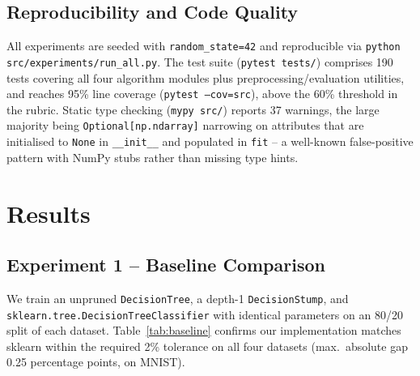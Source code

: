 \documentclass[conference]{IEEEtran}
\begin{document}
\subsection{Reproducibility and Code Quality}
All experiments are seeded with \texttt{random\_state=42} and reproducible via
\texttt{python src/experiments/run\_all.py}. The test suite
(\texttt{pytest tests/}) comprises 190 tests covering all four algorithm
modules plus preprocessing/evaluation utilities, and reaches 95\% line
coverage (\texttt{pytest --cov=src}), above the 60\% threshold in the rubric.
Static type checking (\texttt{mypy src/}) reports 37 warnings, the large
majority being \texttt{Optional[np.ndarray]} narrowing on attributes that are
initialised to \texttt{None} in \texttt{\_\_init\_\_} and populated in
\texttt{fit} -- a well-known false-positive pattern with NumPy stubs rather
than missing type hints.

\section{Results}
\label{sec:results}

\subsection{Experiment 1 -- Baseline Comparison}
\label{sec:results:baseline}
We train an unpruned \texttt{DecisionTree}, a depth-1 \texttt{DecisionStump},
and \texttt{sklearn.tree.DecisionTreeClassifier} with identical parameters on
an 80/20 split of each dataset. Table~\ref{tab:baseline} confirms our
implementation matches sklearn within the required 2\% tolerance on all four
datasets (max.\ absolute gap 0.25 percentage points, on MNIST).

\begin{table}[t]
\caption{Baseline accuracy: our tree vs.\ sklearn vs.\ a stump}
\label{tab:baseline}
\centering
\small
{}
\end{table}
\end{document}

